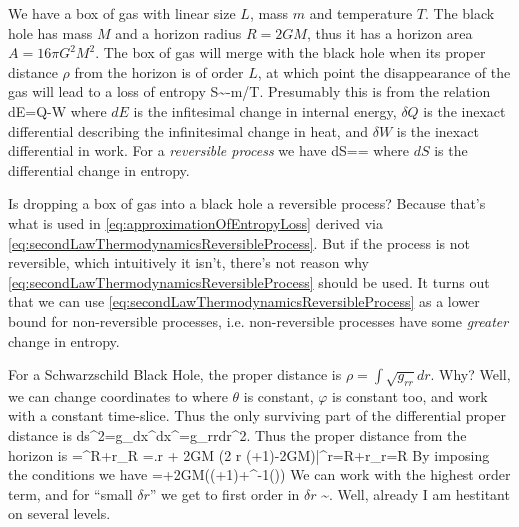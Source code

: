 
We have a box of gas with linear size $L$, mass $m$ and
temperature $T$. The black hole has mass $M$ and a horizon radius
$R=2GM$, thus it has a horizon area $A=16\pi G^{2}M^{2}$. The box
of gas will merge with the black hole when its proper distance
$\rho$ from the horizon is of order $L$, at which point the
disappearance of the gas will lead to a loss of entropy
\equation\label{eq:approximationOfEntropyLoss}
\Delta S\sim -m/T.
\endequation
Presumably this is from the relation
\equation
dE=\delta Q-\delta W
\endequation
where $dE$ is the infitesimal change in internal energy, $\delta
Q$ is the inexact differential describing the infinitesimal
change in heat, and $\delta W$ is the inexact differential in
work. For a {\it reversible process} we have
\equation\label{eq:secondLawThermodynamicsReversibleProcess}
dS==\approx{}
\endequation
where $dS$ is the differential change in entropy.

\problem
Is dropping a box of gas into a black hole a reversible process?
Because that's what is used in \ref{eq:approximationOfEntropyLoss}
derived via \ref{eq:secondLawThermodynamicsReversibleProcess}. But
if the process is not reversible, which intuitively it isn't,
there's not reason why \ref{eq:secondLawThermodynamicsReversibleProcess}
should be used.
\endproblem
\solution
It turns out that we can use \ref{eq:secondLawThermodynamicsReversibleProcess}
as a lower bound for non-reversible processes,
i.e. non-reversible processes have some {\it greater} change in entropy.
\endsolution


For a Schwarzschild Black Hole, the proper distance is $\rho=\int
\sqrt{g_{rr}}dr$. Why? Well, we can change coordinates to where
$\theta$ is constant, $\varphi$ is constant too, and work with a
constant time-slice. Thus the only surviving part of the
differential proper distance is
\equation
ds^{2}=g_{\mu\nu}dx^{\mu}dx^{\nu}=g_{rr}dr^{2}.
\endequation
Thus the proper distance from the horizon is
\equation
\rho=\int^{R+\delta r}_{R}
=\left.r + 2GM \ln\left(2 r
    \left(+1\right)-2GM\right)\right|^{r=R+\delta r}_{r=R}
\endequation
By imposing the conditions we have
\equation
\rho=+2GM\left(\ln\left(+1\right)+\tanh^{-1}\left(\right)\right)
\endequation
We can work with the highest order term, and for ``small $\delta
r$'' we get to first order in $\delta r$
\equation
\rho\sim{}.
\endequation
Well, already I am hestitant on several levels.

